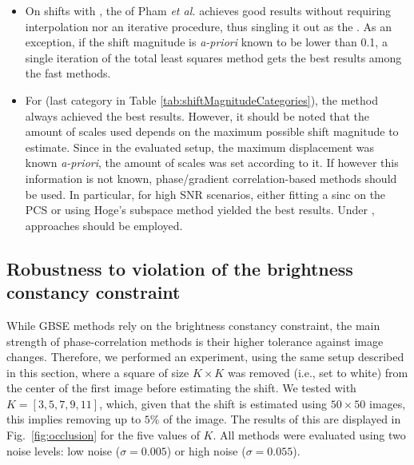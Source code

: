 \begin{itemize}
\item On shifts with , the  of Pham \emph{et al.} \cite{pham2008} achieves good results without requiring interpolation nor an iterative procedure, thus singling it out as the . As an exception, if the shift magnitude is \emph{a-priori} known to be lower than 0.1, a single iteration of the total least squares method gets the best results among the fast methods.
\item For  (last category in Table \ref{tab:shiftMagnitudeCategories}), the  method always achieved the best results. However, it should be noted that the amount of scales used depends on the maximum possible shift magnitude to estimate. Since in the evaluated setup, the maximum displacement was known \emph{a-priori}, the amount of scales was set according to it. If however this information is not known, phase/gradient correlation-based methods should be used. In particular, for high SNR scenarios, either fitting a sinc on the PCS \cite{Foroosh2002} or using Hoge's subspace method \cite{Hoge_2003} yielded the best results. Under ,  approaches should be employed.
\end{itemize}

\subsection{Robustness to violation of the brightness constancy constraint}
While GBSE methods rely on the brightness constancy constraint, the main strength of phase-correlation methods is their higher tolerance against image changes. Therefore, we performed an experiment, using the same setup described in this section,  where a square of size $K \times K$ was removed (i.e., set to white) from the center of the first image before estimating the shift. We tested with $K = [3, 5, 7, 9, 11]$, which, given that the shift is estimated using $50 \times 50$ images, this implies removing up to $5\%$ of the image. The results of this are displayed in Fig.~\ref{fig:occlusion} for the five values of $K$. All methods were evaluated using two noise levels: low noise ($\sigma = 0.005$) or high noise ($\sigma = 0.055$).

